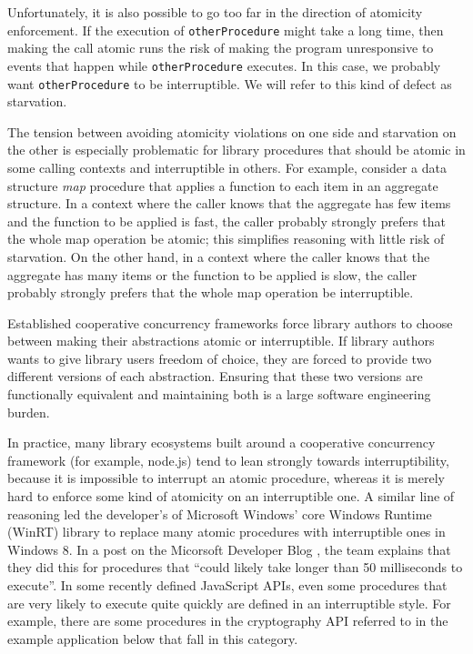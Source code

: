 \documentclass[9pt,preprint]{sigplanconf}
\begin{document}
Unfortunately, it is also possible to go too far in the direction of atomicity enforcement.
If the execution of \texttt{otherProcedure} might take a long time\footnotemark{}, then making the call atomic runs the risk of making the program unresponsive to events that happen while \texttt{otherProcedure} executes.
In this case, we probably want \texttt{otherProcedure} to be interruptible.
We will refer to this kind of defect as starvation.


The tension between avoiding atomicity violations on one side and starvation on the other is especially problematic for library procedures that should be atomic in some calling contexts and interruptible in others.
For example, consider a data structure \emph{map} procedure that applies a function to each item in an aggregate structure.
In a context where the caller knows that the aggregate has few items and the function to be applied is fast, the caller probably strongly prefers that the whole map operation be atomic; this simplifies reasoning with little risk of starvation.
On the other hand, in a context where the caller knows that the aggregate has many items or the function to be applied is slow, the caller probably strongly prefers that the whole map operation be interruptible.

Established cooperative concurrency frameworks force library authors to choose between making their abstractions atomic or interruptible.
If library authors wants to give library users freedom of choice, they are forced to provide two different versions of each abstraction.
Ensuring that these two versions are functionally equivalent and maintaining both is a large software engineering burden.

In practice, many library ecosystems built around a cooperative concurrency framework (for example, node.js) tend to lean strongly towards interruptibility, because it is impossible to interrupt an atomic procedure, whereas it is merely hard to enforce some kind of atomicity on an interruptible one.
A similar line of reasoning led the developer's of Microsoft Windows' core Windows Runtime (WinRT) library to replace many atomic procedures with interruptible ones in Windows 8.
In a post on the Micorsoft Developer Blog \cite{Windows8Team2012}, the team explains that they did this for procedures that ``could likely take longer than 50 milliseconds to execute''.
In some recently defined JavaScript APIs, even some procedures that are very likely to execute quite quickly are defined in an interruptible style.
For example, there are some procedures in the cryptography API referred to in the example application below that fall in this category.
\end{document}
